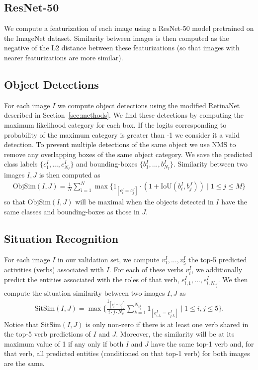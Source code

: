\documentclass[runningheads]{llncs}
\begin{document}
\subsection{ResNet-50}

We compute a featurization of each image using a ResNet-50 model pretrained on the ImageNet dataset. Similarity between images is then computed as the negative of the L2 distance between these featurizations (so that images with nearer featurizations are more similar).

\subsection{Object Detections}

For each image $I$ we compute object detections using the modified RetinaNet described in Section~\ref{sec:methods}. We find these detections by computing the maximum likelihood category for each box. If the logits corresponding to probability of the maximum category is greater than -1 we consider it a valid detection. To prevent multiple detections of the same object we use NMS to remove any overlapping boxes of the same object category. We save the predicted class labels $\{c^I_1, ..., c^I_{N_I}\}$ and bounding-boxes $\{b^I_1, ..., b^I_{N_I}\}$. Similarity between two images $I,J$ is then computed as
\begin{align}
    \text{ObjSim}(I, J) = \frac{1}{N}\sum_{i=1}^N\max \{1_{[c^I_i=c^J_j]}\cdot (1 + \text{IoU}(b^I_i, b^J_j))\mid 1\leq j\leq M\}
\end{align}
so that $\text{ObjSim}(I, J)$ will be maximal when the objects detected in $I$ have the same classes and bounding-boxes as those in $J$.

\subsection{Situation Recognition}

For each image $I$ in our validation set, we compute $v^I_1,...,v^I_5$ the top-5 predicted activities (verbs) associated with $I$. For each of these verbs $v^I_i$, we additionally predict the entities associated with the roles of that verb, $e^I_{i,1}, ..., e^I_{i, N_{v^I_i}}$. We then compute the situation similarity between two images $I,J$ as
\begin{align}
    \text{SitSim}(I, J) = \max\{\frac{1_{[v^I_i = v^J_j]}}{i\cdot j\cdot N_v}\sum_{k=1}^{N_{v^I_i}} 1_{[e^I_{i,k}=e^J_{j,k}]} \mid 1\leq i,j\leq 5\}.
\end{align}
Notice that $\text{SitSim}(I, J)$ is only non-zero if there is at least one verb shared in the top-5 verb predictions of $I$ and $J$. Moreover, the similarity will be at its maximum value of 1 if any only if both $I$ and $J$ have the same top-1 verb and, for that verb, all predicted entities (conditioned on that top-1 verb) for both images are the same.
\end{document}
